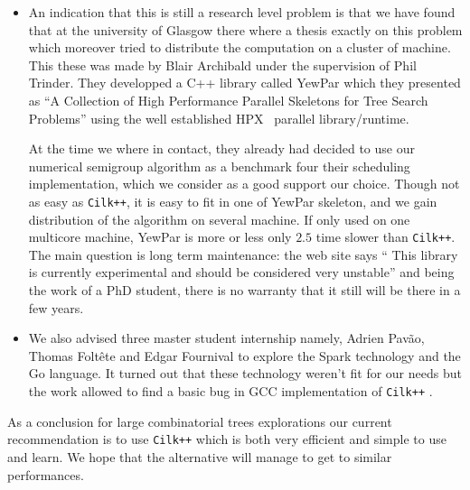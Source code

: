 \documentclass{deliverablereport}
\newcommand{\CilkP}{\texttt{Cilk++}\xspace}
\begin{document}
\begin{itemize}
  Unfortunately for the kinds of computation like numerical semigroup, there
  is a huge number of small task that are spawned. We used the implementation
  from GCC compiler. At the time of our experiment, the finding was that the
  scheduler doesn't scale to this huge number of task. The overhead was
  several order of magnitude larger than \CilkP.

\item An indication that this is still a research level problem is that we
  have found that at the university of Glasgow there where a thesis exactly on
  this problem which moreover tried to distribute the computation on a cluster
  of machine. This these was made by Blair Archibald under the supervision of
  Phil Trinder. They developped a C++ library called YewPar
  \cite{YewPar} which they presented as ``A
  Collection of High Performance Parallel Skeletons for Tree Search Problems''
  using the well established HPX~\cite{HPX} parallel library/runtime.

  At the time we where in contact, they already had decided to use our
  numerical semigroup algorithm as a benchmark four their scheduling
  implementation, which we consider as a good support our choice. Though not
  as easy as \CilkP, it is easy to fit in one of YewPar skeleton, and we gain
  distribution of the algorithm on several machine. If only used on one
  multicore machine, YewPar is more or less only $2.5$ time slower than
  \CilkP. The main question is long term maintenance: the web site says ``
  This library is currently experimental and should be considered very
  unstable'' and being the work of a PhD student, there is no warranty that it
  still will be there in a few years.

\item We also advised three master student internship namely, Adrien Pavão,
  Thomas Foltête and Edgar Fournival to explore the Spark technology and the
  Go language. It turned out that these technology weren't fit for our needs
  but the work allowed to find a basic bug in GCC implementation of \CilkP
  \cite{gcc-bug-80038}.
\end{itemize}

As a conclusion for large combinatorial trees explorations our current
recommendation is to use \CilkP which is both very efficient and simple to use
and learn. We hope that the alternative will manage to get to similar
performances.


\end{document}
